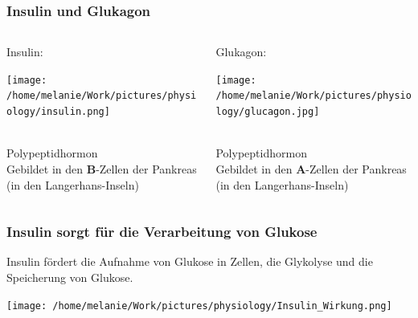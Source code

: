 \documentclass{beamer}
\begin{document}
\begin{frame}
\frametitle{Insulin und Glukagon}

\begin{columns}[t]
\begin{column}{5cm}

Insulin:

\begin{center}
\texttt{[image: /home/melanie/Work/pictures/physiology/insulin.png]}
\end{center}
$\,$\\


Polypeptidhormon \\[0.2 cm]

Gebildet in den \textcolor{theme}{\textbf{B}}-Zellen der Pankreas \\
(in den Langerhans-Inseln)

\end{column}

\begin{column}{5cm}

Glukagon:

\begin{center}
\texttt{[image: /home/melanie/Work/pictures/physiology/glucagon.jpg]}
\end{center}
$\,$\\[0.4 cm]


Polypeptidhormon \\[0.2 cm]

Gebildet in den \textcolor{theme}{\textbf{A}}-Zellen der Pankreas \\
(in den Langerhans-Inseln)

\end{column}
\end{columns}

\end{frame}




\begin{frame}
\frametitle{Insulin sorgt für die Verarbeitung von Glukose}

Insulin fördert die Aufnahme von Glukose in Zellen, die Glykolyse und die Speicherung von Glukose.

\begin{center}
\texttt{[image: /home/melanie/Work/pictures/physiology/Insulin\_Wirkung.png]}
\end{center}



\end{frame}
\end{document}
